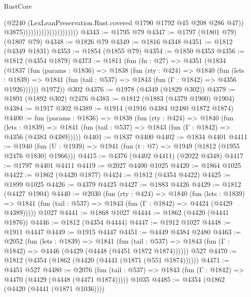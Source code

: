 \begin{lexlean}{RustCore}
\begin{coremodule}
                                              (@2240
                                                (LexLeanPreservation.Rust.covered
                                                  @1790
                                                  @1792
                                                  @45
                                                  @208
                                                  @286
                                                  @47))
                                              @3875)))))))))))))))))))))
@4343 := @1795 @79
@4347 := @1797 (@1801 @79) (@1807 @79)
@4348 := @1826 @79
@4349 := @1816 @4348
@4351 := @1812 (@4349 @1831)
@4353 := @1854 (@1855 @79)
@4354 := @1850 @4353
@4356 := @1812 (@4354 @1879)
@4373 := @1811
    (fun (fn : @27) =>
    @4351
      (@1834
        (@1837
          (fun (params : @1836) =>
          @1838
            (fun (rty : @424) =>
            @1840
              (fun (lets : @1839) =>
              @1841 (fun (tail : @537) => @1843 (fun (Γ : @1842) => @4356 @1926))))))
        @1972))
    @302
@4376 := @1978 (@4349 (@1829 @302))
@4379 := @1891 (@1892 @302) @2476
@4383 := @1812 (@1883 (@4379 @1900) @1904)
@4384 := @1917 @302
@4389 := @1914 (@1916 @4384 @2480 @1872 @1874)
@4400 := fun (params : @1836) =>
  @1838
    (fun (rty : @424) =>
    @1840
      (fun (lets : @1839) =>
      @1841 (fun (tail : @537) => @1843 (fun (Γ : @1842) => @4356 (@4383 @4389)))))
@4401 := @1837 @4400
@4402 := @1834 @4401
@4411 := @1940 (fun (U : @1939) => @1941 (fun (t : @7) => @1949 (@1812 (@1955 @2476 @1830) @1966)))
@4415 := @4376 (@4402 @4411) (@2022 @4348)
@4417 := @1797 @4401 @4411
@4419 := @2027 @4400 @1025
@4420 := @1864 @1025
@4422 := @1862 (@4420 @1877)
@4424 := @1812 (@4354 @4422)
@4425 := @1899 @1025
@4426 := @4379 @4425
@4427 := @1883 @4426
@4429 := @1812 (@4427 @1904)
@4440 := @2030
    (fun (rty : @424) =>
    @1840
      (fun (lets : @1839) =>
      @1841 (fun (tail : @537) => @1843 (fun (Γ : @1842) => @4424 (@4429 @4389)))))
    @1027
@4441 := @1868 @1027
@4444 := @1862 (@4420 (@4441 @1876))
@4446 := @1812 (@4354 @4444)
@4447 := @1912 @1027
@4448 := @1911 @4447
@4449 := @1915 @4447
@4451 := @4449 @4384 @2480
@4463 := @2052
    (fun (lets : @1839) =>
    @1841
      (fun (tail : @537) => @1843 (fun (Γ : @1842) => @4446 (@4429 (@4448 (@4451 @1872 @1874))))))
    @527
@4470 := @1812 (@4354 (@1862 (@4420 (@4441 (@1871 (@551 @1874))))))
@4471 := @4451 @527
@4480 := @2076
    (fun (tail : @537) => @1843 (fun (Γ : @1842) => @4470 (@4429 (@4448 (@4471 @1874)))))
    @1035
@4485 := @4354 (@1862 (@4420 (@4441 (@1871 @1036))))

\end{coremodule}
\end{lexlean}
